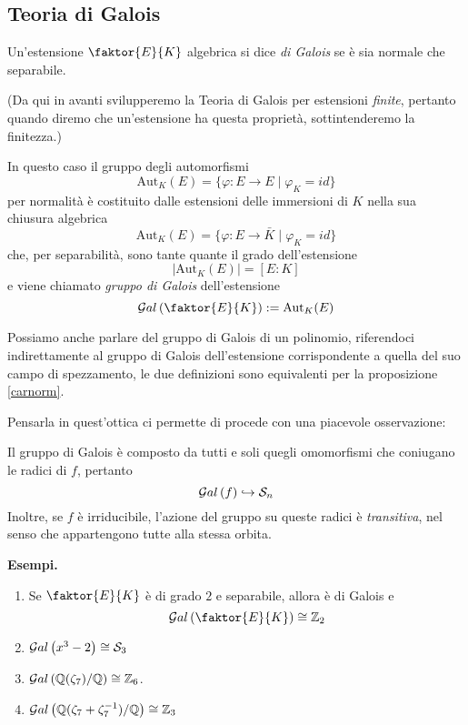 \subsection{Teoria di Galois}
\begin{multicols}{2}
	
	\begin{definition}
		Un'estensione $ \faktor{E}{K} $ algebrica si dice \emph{di Galois} se è sia normale che separabile.
	\end{definition}
	
	(Da qui in avanti svilupperemo la Teoria di Galois per estensioni \emph{finite}, pertanto quando diremo che un'estensione ha questa proprietà, sottintenderemo la finitezza.)
	
	
	In questo caso il gruppo degli automorfismi 
	\[ \text{Aut}_K(E) = \{ \varphi : E \to E \mid \varphi_K = id \} \]
	per normalità è costituito dalle estensioni delle immersioni di $ K $ nella sua chiusura algebrica
	\[ \text{Aut}_K(E) = \{ \varphi : E \to \bar{K} \mid \varphi_K = id  \} \]
	che, per separabilità, sono tante quante il grado dell'estensione
	\[ |\text{Aut}_K(E)| = [E : K] \]
	e viene chiamato \emph{gruppo di Galois} dell'estensione
	\[ \Gal{\faktor{E}{K}} := \text{Aut}_K(E) \]
	
	Possiamo anche parlare del gruppo di Galois di un polinomio, riferendoci indirettamente al gruppo di Galois dell'estensione corrispondente a quella del suo campo di spezzamento, le due definizioni sono equivalenti per la proposizione \ref{carnorm}.
	
	Pensarla in quest'ottica ci permette di procede con una piacevole osservazione:
	\begin{remark}
		Il gruppo di Galois è composto da tutti e soli quegli omomorfismi che coniugano le radici di $ f $, pertanto
		\[ \mathcal{G}al\left( f \right) \hookrightarrow \mathcal{S}_n \]
		Inoltre, se $ f $ è irriducibile, l'azione del gruppo su queste radici è \emph{transitiva}, nel senso che appartengono tutte alla stessa orbita.
	\end{remark}
	
	\textbf{Esempi.}
	\begin{enumerate}
		\item Se $ \faktor{E}{K} $ è di grado $ 2 $ e separabile, allora è di Galois e
		\[ \Gal{\faktor{E}{K}} \cong \Z_2 \]
		\item $ \mathcal{G}al\left( x^3 -2 \right) \cong \mathcal{S}_3 $
		\item $ \mathcal{G}al\left( \mathbb{Q}(\zeta_7)/\mathbb{Q} \right) \cong \mathbb{Z}_6 $.
		\item $ \mathcal{G}al\left( \mathbb{Q}(\zeta_7+ \zeta_7^{-1})/\mathbb{Q} \right) \cong \mathbb{Z}_3 $
	\end{enumerate}
	

\end{multicols}
